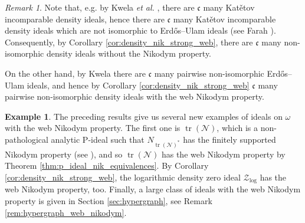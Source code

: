 \documentclass[a4paper,11pt,fleqn]{amsart}
\theoremstyle{definition}
\newtheorem{example}[theorem]{Example}
\theoremstyle{remark}
\newtheorem{remark}[theorem]{Remark}
\numberwithin{equation}{section}
\newcommand{\frakc}{\mathfrak{c}}
\newcommand{\nN}{\mathcal{N}}
\newcommand{\zZ}{\mathcal{Z}}
\newcommand{\erdos}{{Erd\H{o}s}}
\DeclareMathOperator{\tr}{tr}
\begin{document}
\begin{remark}\label{rem:c_many_density}
    Note that, e.g. by Kwela \textit{et al.} \cite[Theorem 3]{KPST}, there are $\frakc$ many Kat\v{e}tov incomparable density ideals, hence there are $\frakc$ many Kat\v{e}tov incomparable density ideals which are not isomorphic to \erdos--Ulam ideals (see Farah \cite[Lemma 1.13.10]{Far00}). Consequently, by Corollary \ref{cor:density_nik_strong_web}, there are $\frakc$ many non-isomorphic density ideals without the Nikodym property. 

    On the other hand, by Kwela \cite[Propositions 5 and 6]{Kwe18} there are $\frakc$ many pairwise non-isomorphic \erdos--Ulam ideals, and hence by Corollary \ref{cor:density_nik_strong_web} $\frakc$ many pairwise non-isomorphic density ideals with the web Nikodym property.
\end{remark}

%

\begin{example}\label{example:new_web_nikodym}
The preceding results give us several new examples of ideals on $\omega$ with the web Nikodym property. The first one is $\tr(\nN)$, which is a non-pathological analytic P-ideal such that $N_{\tr(\nN)^*}$ has the finitely supported Nikodym property (see \cite[page 728]{Zuc25}), and so $\tr(\nN)$ has the web Nikodym property by Theorem \ref{thm:p_ideal_nik_equivalences}. By Corollary \ref{cor:density_nik_strong_web}, the logarithmic density zero ideal $\zZ_{\log}$ has the web Nikodym property, too. Finally, a large class of ideals with the web Nikodym property is given in Section \ref{sec:hypergraph}, see Remark \ref{rem:hypergraph_web_nikodym}.
\end{example}
\end{document}
